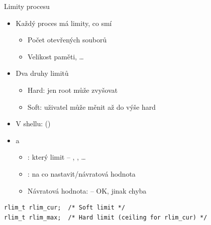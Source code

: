 \begin{frame}[fragile]{Limity procesu}

  \begin{itemize}
    \item Každý proces má limity, co smí
    \begin{itemize}
      \item Počet otevřených souborů
      \item Velikost paměti, \dots
    \end{itemize}

    \pause

    \item Dva druhy limitů
    \begin{itemize}
      \item Hard: jen root může zvyšovat
      \item Soft: uživatel může měnit až do výše hard
    \end{itemize}

    \pause

    \item V shellu:  ()

      \pause %

    \item {} a
    \begin{itemize}
      \item {}: který limit -- ,
	, \dots
      \item {}: na co nastavit/návratová hodnota
      \item Návratová hodnota:  -- OK, jinak chyba
    \end{itemize}
  \end{itemize}

  \begin{block}{}
  \begin{lstlisting}
rlim_t rlim_cur;  /* Soft limit */
rlim_t rlim_max;  /* Hard limit (ceiling for rlim_cur) */
  \end{lstlisting}
  \end{block}

\end{frame}

